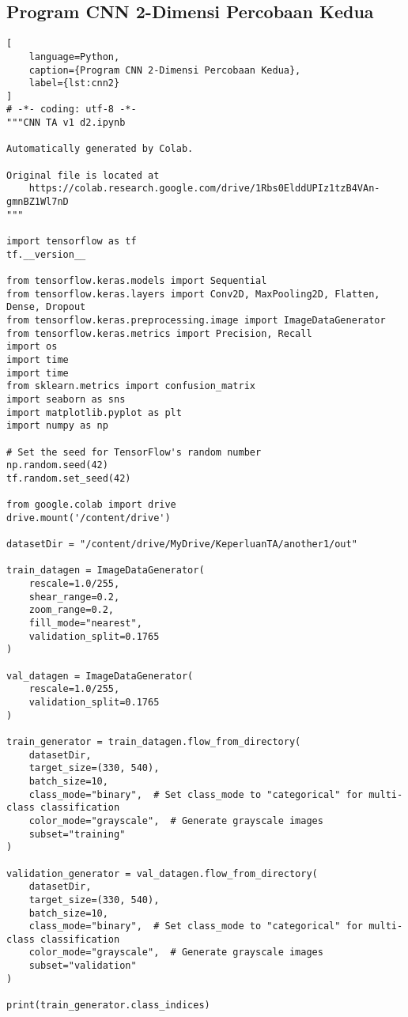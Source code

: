 \subsection*{Program CNN 2-Dimensi Percobaan Kedua}
\begin{lstlisting}[
    language=Python,
    caption={Program CNN 2-Dimensi Percobaan Kedua},
    label={lst:cnn2}
]
# -*- coding: utf-8 -*-
"""CNN TA v1 d2.ipynb

Automatically generated by Colab.

Original file is located at
    https://colab.research.google.com/drive/1Rbs0ElddUPIz1tzB4VAn-gmnBZ1Wl7nD
"""

import tensorflow as tf
tf.__version__

from tensorflow.keras.models import Sequential
from tensorflow.keras.layers import Conv2D, MaxPooling2D, Flatten, Dense, Dropout
from tensorflow.keras.preprocessing.image import ImageDataGenerator
from tensorflow.keras.metrics import Precision, Recall
import os
import time
import time
from sklearn.metrics import confusion_matrix
import seaborn as sns
import matplotlib.pyplot as plt
import numpy as np

# Set the seed for TensorFlow's random number
np.random.seed(42)
tf.random.set_seed(42)

from google.colab import drive
drive.mount('/content/drive')

datasetDir = "/content/drive/MyDrive/KeperluanTA/another1/out"

train_datagen = ImageDataGenerator(
    rescale=1.0/255,
    shear_range=0.2,
    zoom_range=0.2,
    fill_mode="nearest",
    validation_split=0.1765
)

val_datagen = ImageDataGenerator(
    rescale=1.0/255,
    validation_split=0.1765
)

train_generator = train_datagen.flow_from_directory(
    datasetDir,
    target_size=(330, 540),
    batch_size=10,
    class_mode="binary",  # Set class_mode to "categorical" for multi-class classification
    color_mode="grayscale",  # Generate grayscale images
    subset="training"
)

validation_generator = val_datagen.flow_from_directory(
    datasetDir,
    target_size=(330, 540),
    batch_size=10,
    class_mode="binary",  # Set class_mode to "categorical" for multi-class classification
    color_mode="grayscale",  # Generate grayscale images
    subset="validation"
)

print(train_generator.class_indices)


\end{lstlisting}
